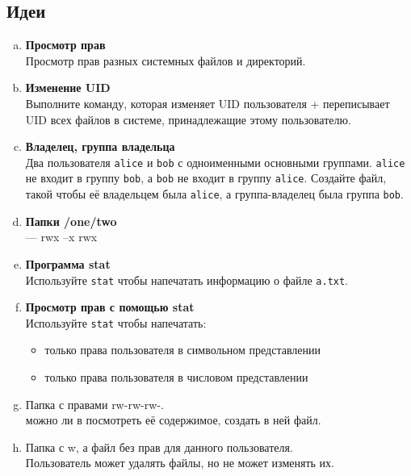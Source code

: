 \documentclass{article}
\begin{document}
\subsection*{Идеи}
\begin{enumerate}[a.]

\item \textbf{Просмотр прав}\\
Просмотр прав разных системных файлов и директорий.



\item \textbf{Изменение UID}\\
Выполните команду, которая изменяет UID пользователя + переписывает UID всех файлов в системе, принадлежащие этому пользователю. 

\item \textbf{Владелец, группа владельца}\\
Два пользователя \texttt{alice} и \texttt{bob} с одноименными основными группами. \texttt{alice} не входит в группу \texttt{bob}, а \texttt{bob} не входит в группу \texttt{alice}. Создайте файл, такой чтобы её владельцем была \texttt{alice}, а группа-владелец была группа \texttt{bob}.

\item \textbf{Папки /one/two}\\
--- rwx
--x rwx

\item \textbf{Программа stat}\\
Используйте \texttt{stat} чтобы напечатать информацию о файле \texttt{a.txt}.

\item \textbf{Просмотр прав с помощью stat}\\
Используйте \texttt{stat} чтобы напечатать: 
\begin{itemize}
\item только права пользователя в символьном представлении
\item только права пользователя в числовом представлении
\end{itemize}

\item Папка с правами rw-rw-rw-.\\
можно ли в посмотреть её содержимое, создать в ней файл.


\item Папка с w, а файл без прав для данного пользователя.\\
Пользователь может удалять файлы, но не может изменять их.



\end{enumerate}
\end{document}

